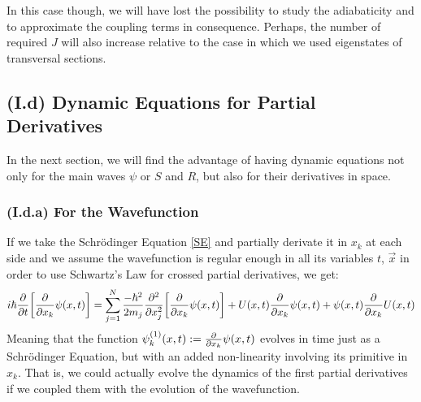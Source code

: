\documentclass[11pt, a4paper]{article} %
\begin{document}
In this case though, we will have lost the possibility to study the adiabaticity and to approximate the coupling terms in consequence. Perhaps, the number of required $J$ will also increase relative to the case in which we used eigenstates of transversal sections.



\subsection*{(I.d) Dynamic Equations for Partial Derivatives}
In the next section, we will find the advantage of having dynamic equations not only for the main waves $\psi$ or $S$ and $R$, but also for their derivatives in space.

\subsubsection*{(I.d.a) For the Wavefunction}
If we take the Schrödinger Equation \eqref{SE} and partially derivate it in $x_k$ at each side and we assume the wavefunction is regular enough in all its variables $t$, $\vec{x}$ in order to use Schwartz's Law for crossed partial derivatives, we get:
\begin{equation}
i\hbar \pdv{}{t}\qty[\pdv{}{x_k}\psi(x,t)] = \sum_{j=1}^N\frac{-\hbar^2}{2m_j}\pdv[2]{}{x_j}\qty[\pdv{}{x_k}\psi(x,t)]+U(x,t)\pdv{}{x_k}\psi(x,t) + \psi(x,t)\pdv{}{x_k}U(x,t)
\end{equation}
Meaning that the function $\psi^{(1)}_k(x,t):=\pdv{}{x_k}\psi(x,t)$ evolves in time just as a Schrödinger Equation, but with an added non-linearity involving its primitive in $x_k$. That is, we could actually evolve the dynamics of the first partial derivatives if we coupled them with the evolution of the wavefunction.
\end{document}
